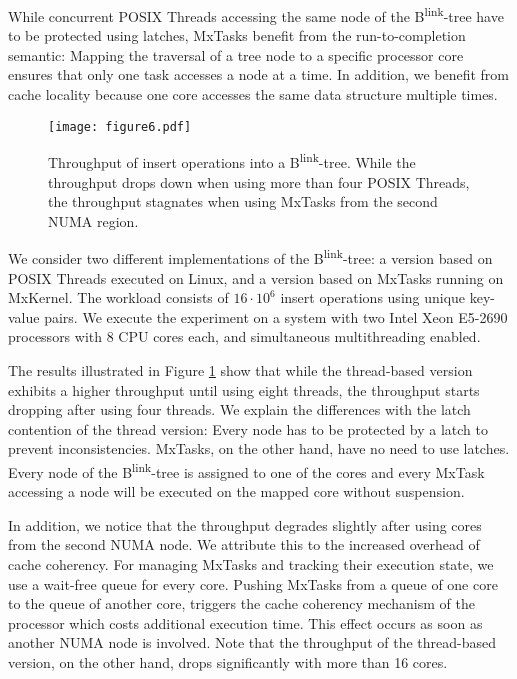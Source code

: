 \documentclass[11pt]{article}
\begin{document}
While concurrent POSIX Threads accessing the same node of the B\textsuperscript{link}-tree have to be protected using latches, MxTasks benefit from the run-to-completion semantic:
Mapping the traversal of a tree node to a specific processor core ensures that only one task accesses a node at a time.
In addition, we benefit from cache locality because one core accesses the same data structure multiple times.

\begin{figure}
\centering
\texttt{[image: figure6.pdf]}
\caption{Throughput of insert operations into a B\textsuperscript{link}-tree. While the throughput drops down when using more than four POSIX Threads, the throughput stagnates when using MxTasks from the second NUMA region.}
\label{nollhrm19:fig:blinktree:results}
\end{figure}

We consider two different implementations of the B\textsuperscript{link}-tree: a version based on POSIX Threads executed on Linux, and a version based on MxTasks running on MxKernel.
The workload consists of $16 \cdot 10^6$ insert operations using unique key-value pairs.
We execute the experiment on a system with two Intel Xeon E5-2690 processors with 8 CPU cores each, and simultaneous multithreading enabled.

The results illustrated in Figure \ref{nollhrm19:fig:blinktree:results} show that while the thread-based version exhibits a higher throughput until using eight threads, the throughput starts dropping after using four threads.
We explain the differences with the latch contention of the thread version:
Every node has to be protected by a latch to prevent inconsistencies.
MxTasks, on the other hand, have no need to use latches.
Every node of the B\textsuperscript{link}-tree is assigned to one of the cores and every MxTask accessing a node will be executed on the mapped core without suspension.

In addition, we notice that the throughput degrades slightly after using cores from the second NUMA node.
We attribute this to the increased overhead of cache coherency.
For managing MxTasks and tracking their execution state, we use a wait-free queue for every core.
Pushing MxTasks from a queue of one core to the queue of another core, triggers the cache coherency mechanism of the processor which costs additional execution time.
This effect occurs as soon as another NUMA node is involved.
Note that the throughput of the thread-based version, on the other hand, drops significantly with more than 16 cores.
\end{document}
